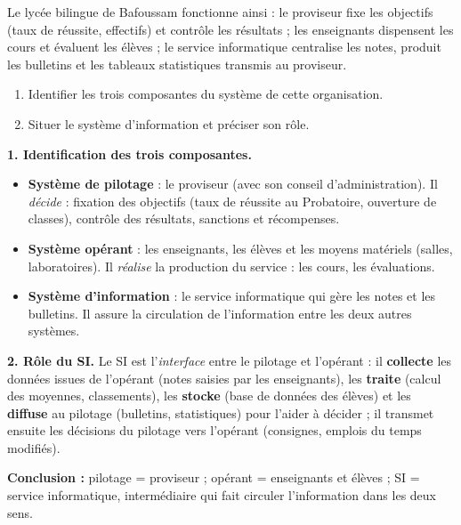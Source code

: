 \documentclass[11pt]{article}
\begin{document}
\begin{exoresolu}
Le lycée bilingue de Bafoussam fonctionne ainsi : le proviseur fixe les objectifs (taux de réussite, effectifs) et contrôle les résultats ; les enseignants dispensent les cours et évaluent les élèves ; le service informatique centralise les notes, produit les bulletins et les tableaux statistiques transmis au proviseur.
\begin{enumerate}
\item Identifier les trois composantes du système de cette organisation.
\item Situer le système d'information et préciser son rôle.
\end{enumerate}
\tcblower
\textbf{1. Identification des trois composantes.}
\begin{itemize}
\item \textbf{Système de pilotage} : le proviseur (avec son conseil d'administration). Il \emph{décide} : fixation des objectifs (taux de réussite au Probatoire, ouverture de classes), contrôle des résultats, sanctions et récompenses.
\item \textbf{Système opérant} : les enseignants, les élèves et les moyens matériels (salles, laboratoires). Il \emph{réalise} la production du service : les cours, les évaluations.
\item \textbf{Système d'information} : le service informatique qui gère les notes et les bulletins. Il assure la circulation de l'information entre les deux autres systèmes.
\end{itemize}
\textbf{2. Rôle du SI.} Le SI est l'\emph{interface} entre le pilotage et l'opérant : il \textbf{collecte} les données issues de l'opérant (notes saisies par les enseignants), les \textbf{traite} (calcul des moyennes, classements), les \textbf{stocke} (base de données des élèves) et les \textbf{diffuse} au pilotage (bulletins, statistiques) pour l'aider à décider ; il transmet ensuite les décisions du pilotage vers l'opérant (consignes, emplois du temps modifiés).

\textbf{Conclusion :} pilotage = proviseur ; opérant = enseignants et élèves ; SI = service informatique, intermédiaire qui fait circuler l'information dans les deux sens.
\end{exoresolu}
\end{document}
